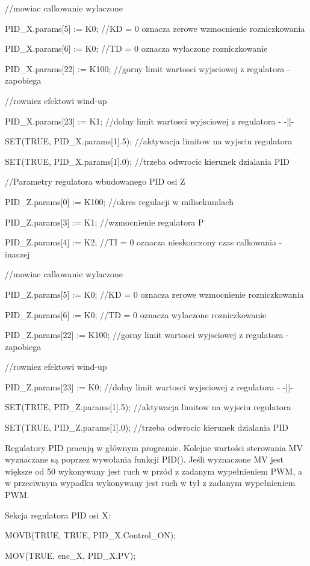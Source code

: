 \documentclass{mwrep}
\begin{document}
//mowiac calkowanie wylaczone

PID\_X.params[5] := K0; //KD = 0 oznacza zerowe wzmocnienie rozniczkowania

PID\_X.params[6] := K0; //TD = 0 oznacza wylaczone rozniczkowanie 

PID\_X.params[22] := K100; //gorny limit wartosci wyjsciowej z regulatora - zapobiega

//rowniez efektowi wind-up

PID\_X.params[23] := K1; //dolny limit wartosci wyjsciowej z regulatora - -||-

SET(TRUE, PID\_X.params[1].5); //aktywacja limitow na wyjsciu regulatora

SET(TRUE, PID\_X.params[1].0); //trzeba odwrocic kierunek dzialania PID 


//Parametry regulatora wbudowanego PID osi Z

PID\_Z.params[0] := K100; //okres regulacji w milisekundach

PID\_Z.params[3] := K1; //wzmocnienie regulatora P

PID\_Z.params[4] := K2; //TI = 0 oznacza nieskonczony czas calkowania - inaczej

//mowiac calkowanie wylaczone

PID\_Z.params[5] := K0; //KD = 0 oznacza zerowe wzmocnienie rozniczkowania

PID\_Z.params[6] := K0; //TD = 0 oznacza wylaczone rozniczkowanie 

PID\_Z.params[22] := K100; //gorny limit wartosci wyjsciowej z regulatora - zapobiega

//rowniez efektowi wind-up

PID\_Z.params[23] := K0; //dolny limit wartosci wyjsciowej z regulatora - -||-

SET(TRUE, PID\_Z.params[1].5); //aktywacja limitow na wyjsciu regulatora

SET(TRUE, PID\_Z.params[1].0); //trzeba odwrocic kierunek dzialania PID 


Regulatory PID pracują w głównym programie. Kolejne wartości sterowania MV wyznaczane są poprzez wywołania funkcji PID(). Jeśli wyznaczone MV jest większe od 50 wykonywany jest ruch w przód z zadanym wypełnieniem PWM, a w przeciwnym wypadku wykonywany jest ruch w tył z zadanym wypełnieniem PWM.

Sekcja regulatora PID osi X:

\quad MOVB(TRUE, TRUE, PID\_X.Control\_ON);

\quad MOV(TRUE, enc\_X, PID\_X.PV);
\end{document}
